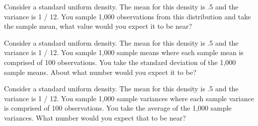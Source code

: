 \documentclass{homework}
\begin{document}
\begin{tcolorbox}[title=Question 14]
Consider a standard uniform density. The mean for this density is .5 and the variance is 1 / 12. You sample 1,000 observations from this distribution and take the sample mean, what value would you expect it to be near?
\end{tcolorbox}

\begin{tcolorbox}[title=Question 15]
Consider a standard uniform density. The mean for this density is .5 and the variance is 1 / 12. You sample 1,000 sample means where each sample mean is comprised of 100 observations. You take the standard deviation of the 1,000 sample means. About what number would you expect it to be?
\end{tcolorbox}

\begin{tcolorbox}[title=Question 16]
Consider a standard uniform density. The mean for this density is .5 and the variance is 1 / 12. You sample 1,000 sample variances where each sample variance is comprised of 100 observations. You take the average of the 1,000 sample variances. What number would you expect that to be near?
\end{tcolorbox}
\end{document}
